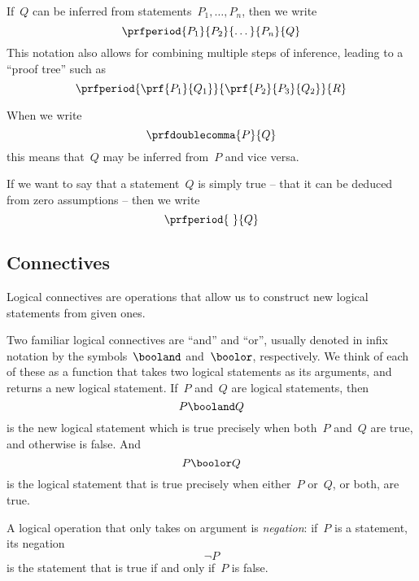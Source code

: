 If~$Q$ can be inferred from statements~$P_1, \ldots, P_n$, then we write
\begin{equation}
    \prfperiod{
        P_1
    }{
        P_2
    }{
        \dots
    }{
        P_n
    }{
        Q
    }
\end{equation}
This notation also allows for combining multiple steps of inference, leading to a ``proof tree'' such as
\begin{equation}
    \prfperiod{
        \prf{
            P_1
        }{
            Q_1
        }
    }{
        \prf{
            P_2
        }{
            P_3
        }{
            Q_2
        }
    }{
        R
    }
\end{equation}

When we write
\begin{equation}
    \prfdoublecomma{
        P
    }{
        Q
    }
\end{equation}
this means that~$Q$ may be inferred from~$P$ and vice versa.

If we want to say that a statement~$Q$ is simply true -- that it can be deduced from zero assumptions -- then we write
\begin{equation}
    \prfperiod{
        \
    }{
        Q
    }
\end{equation}

\subsection{Connectives}

Logical connectives are operations that allow us to construct new logical statements from given ones.

Two familiar logical connectives are ``and'' and ``or'', usually denoted in infix notation by the symbols~$\booland$ and~$\boolor$, respectively.
We think of each of these as a function that takes two logical statements as its arguments, and returns a new logical statement.
If~$P$ and~$Q$ are logical statements, then
%
\begin{equation}
    P \booland Q
\end{equation}
%
is the new logical statement which is true precisely when both~$P$ and~$Q$ are true, and otherwise is false.
And
\begin{equation}
    P \boolor Q
\end{equation}
is the logical statement that is true precisely when either~$P$ or~$Q$, or both, are true.

A logical operation that only takes on argument is \emph{negation}: if~$P$ is a statement, its negation
\begin{equation}
    \lnot P
\end{equation}
is the statement that is true if and only if~$P$ is false.

